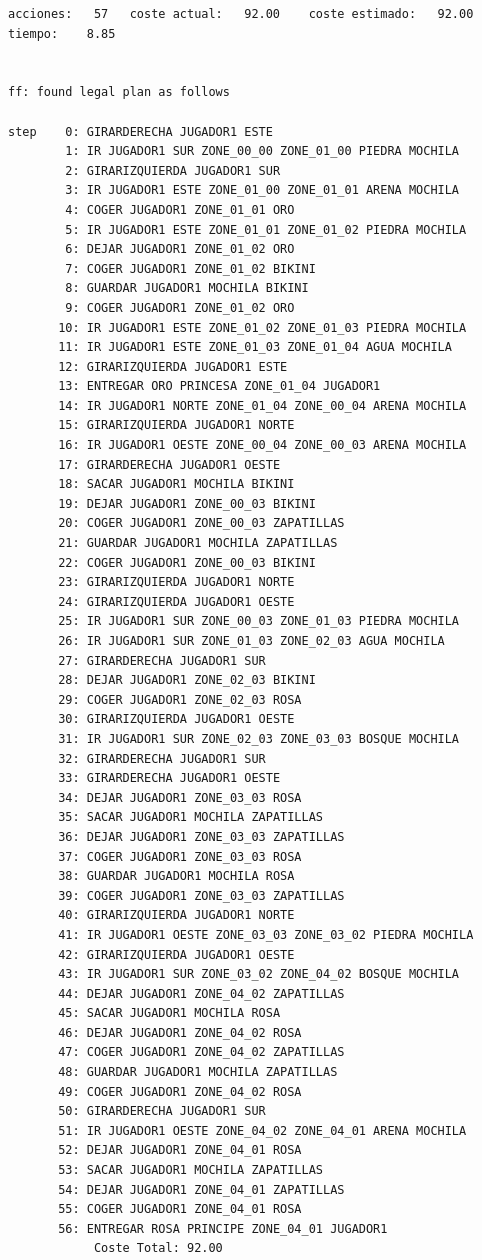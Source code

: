 \documentclass[12pt]{article}
\begin{document}
\begin{verbatim}
acciones:   57   coste actual:   92.00    coste estimado:   92.00    tiempo:    8.85


ff: found legal plan as follows

step    0: GIRARDERECHA JUGADOR1 ESTE
        1: IR JUGADOR1 SUR ZONE_00_00 ZONE_01_00 PIEDRA MOCHILA
        2: GIRARIZQUIERDA JUGADOR1 SUR
        3: IR JUGADOR1 ESTE ZONE_01_00 ZONE_01_01 ARENA MOCHILA
        4: COGER JUGADOR1 ZONE_01_01 ORO
        5: IR JUGADOR1 ESTE ZONE_01_01 ZONE_01_02 PIEDRA MOCHILA
        6: DEJAR JUGADOR1 ZONE_01_02 ORO
        7: COGER JUGADOR1 ZONE_01_02 BIKINI
        8: GUARDAR JUGADOR1 MOCHILA BIKINI
        9: COGER JUGADOR1 ZONE_01_02 ORO
       10: IR JUGADOR1 ESTE ZONE_01_02 ZONE_01_03 PIEDRA MOCHILA
       11: IR JUGADOR1 ESTE ZONE_01_03 ZONE_01_04 AGUA MOCHILA
       12: GIRARIZQUIERDA JUGADOR1 ESTE
       13: ENTREGAR ORO PRINCESA ZONE_01_04 JUGADOR1
       14: IR JUGADOR1 NORTE ZONE_01_04 ZONE_00_04 ARENA MOCHILA
       15: GIRARIZQUIERDA JUGADOR1 NORTE
       16: IR JUGADOR1 OESTE ZONE_00_04 ZONE_00_03 ARENA MOCHILA
       17: GIRARDERECHA JUGADOR1 OESTE
       18: SACAR JUGADOR1 MOCHILA BIKINI
       19: DEJAR JUGADOR1 ZONE_00_03 BIKINI
       20: COGER JUGADOR1 ZONE_00_03 ZAPATILLAS
       21: GUARDAR JUGADOR1 MOCHILA ZAPATILLAS
       22: COGER JUGADOR1 ZONE_00_03 BIKINI
       23: GIRARIZQUIERDA JUGADOR1 NORTE
       24: GIRARIZQUIERDA JUGADOR1 OESTE
       25: IR JUGADOR1 SUR ZONE_00_03 ZONE_01_03 PIEDRA MOCHILA
       26: IR JUGADOR1 SUR ZONE_01_03 ZONE_02_03 AGUA MOCHILA
       27: GIRARDERECHA JUGADOR1 SUR
       28: DEJAR JUGADOR1 ZONE_02_03 BIKINI
       29: COGER JUGADOR1 ZONE_02_03 ROSA
       30: GIRARIZQUIERDA JUGADOR1 OESTE
       31: IR JUGADOR1 SUR ZONE_02_03 ZONE_03_03 BOSQUE MOCHILA
       32: GIRARDERECHA JUGADOR1 SUR
       33: GIRARDERECHA JUGADOR1 OESTE
       34: DEJAR JUGADOR1 ZONE_03_03 ROSA
       35: SACAR JUGADOR1 MOCHILA ZAPATILLAS
       36: DEJAR JUGADOR1 ZONE_03_03 ZAPATILLAS
       37: COGER JUGADOR1 ZONE_03_03 ROSA
       38: GUARDAR JUGADOR1 MOCHILA ROSA
       39: COGER JUGADOR1 ZONE_03_03 ZAPATILLAS
       40: GIRARIZQUIERDA JUGADOR1 NORTE
       41: IR JUGADOR1 OESTE ZONE_03_03 ZONE_03_02 PIEDRA MOCHILA
       42: GIRARIZQUIERDA JUGADOR1 OESTE
       43: IR JUGADOR1 SUR ZONE_03_02 ZONE_04_02 BOSQUE MOCHILA
       44: DEJAR JUGADOR1 ZONE_04_02 ZAPATILLAS
       45: SACAR JUGADOR1 MOCHILA ROSA
       46: DEJAR JUGADOR1 ZONE_04_02 ROSA
       47: COGER JUGADOR1 ZONE_04_02 ZAPATILLAS
       48: GUARDAR JUGADOR1 MOCHILA ZAPATILLAS
       49: COGER JUGADOR1 ZONE_04_02 ROSA
       50: GIRARDERECHA JUGADOR1 SUR
       51: IR JUGADOR1 OESTE ZONE_04_02 ZONE_04_01 ARENA MOCHILA
       52: DEJAR JUGADOR1 ZONE_04_01 ROSA
       53: SACAR JUGADOR1 MOCHILA ZAPATILLAS
       54: DEJAR JUGADOR1 ZONE_04_01 ZAPATILLAS
       55: COGER JUGADOR1 ZONE_04_01 ROSA
       56: ENTREGAR ROSA PRINCIPE ZONE_04_01 JUGADOR1
     		Coste Total: 92.00

\end{verbatim}
\end{document}
